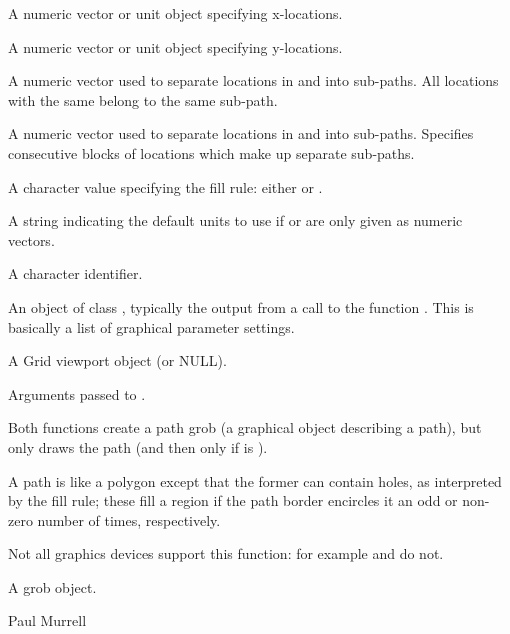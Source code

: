 \begin{Arguments}
\begin{ldescription}
\item[\code{x}] A numeric vector or unit object specifying x-locations.
\item[\code{y}] A numeric vector or unit object specifying y-locations.
\item[\code{id}] A numeric vector used to separate locations in  and
 into sub-paths.  All locations with the same
 belong to the same sub-path.
\item[\code{id.lengths}] A numeric vector used to separate locations in  and
 into sub-paths.  Specifies consecutive blocks of
locations which make up separate sub-paths.
\item[\code{rule}] A character value specifying the fill rule: either
 or .
\item[\code{default.units}] A string indicating the default units to use
if  or 
are only given as numeric vectors. 
\item[\code{name}]  A character identifier. 
\item[\code{gp}] An object of class , typically the output
from a call to the function .  This is basically
a list of graphical parameter settings.
\item[\code{vp}] A Grid viewport object (or NULL).
\item[\code{...}] Arguments passed to .
\end{ldescription}
\end{Arguments}
%
\begin{Details}\relax
Both functions create a path grob (a graphical object describing a
path), but only  draws the path (and then only if
 is ).

A path is like a polygon except that the former can contain holes, as
interpreted by the fill rule; these fill a region if the path border
encircles it an odd or non-zero number of times, respectively.

Not all graphics devices support this function: for example
 and  do not.
\end{Details}
%
\begin{Value}
A grob object.
\end{Value}
%
\begin{Author}\relax
Paul Murrell
\end{Author}
